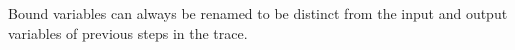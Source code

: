 \documentclass[
  class=../hdeyoung-proposal,
  crop=false
]{standalone}
\begin{document}



Bound variables can always be renamed to be distinct from the input and output variables of previous steps in the trace.








\end{document}
